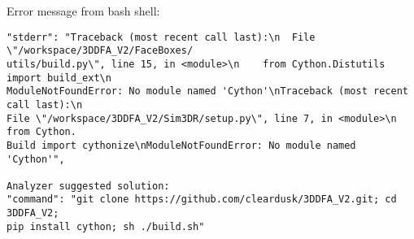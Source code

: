 \begin{table*}[th!]
\begin{mybody}
Error message from bash shell:
\begin{verbatim}
"stderr": "Traceback (most recent call last):\n  File \"/workspace/3DDFA_V2/FaceBoxes/
utils/build.py\", line 15, in <module>\n    from Cython.Distutils import build_ext\n
ModuleNotFoundError: No module named 'Cython'\nTraceback (most recent call last):\n  
File \"/workspace/3DDFA_V2/Sim3DR/setup.py\", line 7, in <module>\n    from Cython.
Build import cythonize\nModuleNotFoundError: No module named 'Cython'",

Analyzer suggested solution:
"command": "git clone https://github.com/cleardusk/3DDFA_V2.git; cd 3DDFA_V2; 
pip install cython; sh ./build.sh"
\end{verbatim}
\end{mybody}
\label{tab:commands_1}
\end{table*}

\clearpage %
\newpage %

